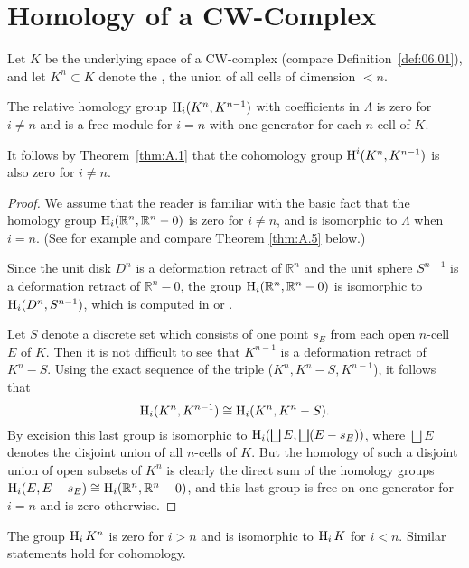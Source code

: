 \documentclass[../main]{subfiles}
\begin{document}
\section{Homology of a CW-Complex}
Let $K$ be the underlying space of a CW-complex (compare Definition~\ref{def:06.01}), and let $K^n \subset K$ denote the , the union of all cells of dimension $<n$. \\
\begin{lemma}\label{lem:A.2}
The relative homology group $\operatorname{H}_i (K^n , K^{n-1})$ with coefficients in $\Lambda$ is zero for $i\neq n$ and is a free module for $i=n$ with one generator for each $n$-cell of $K$.
\end{lemma}
It follows by Theorem~\ref{thm:A.1} that the cohomology group $\operatorname{H}^i (K^n, K^{n-1})$ is also zero for $i\neq n$.

\begin{proof}
We assume that the reader is familiar with the basic fact that the homology group $\operatorname{H}_i (\mathbb{R}^n, \mathbb{R}^n - 0)$ is zero for $i\neq n$, and is isomorphic to $\Lambda$ when $i=n$. (See for example \cite[p. 56]{dold1972} and compare Theorem \ref{thm:A.5} below.) %

Since the unit disk $D^n$ is a deformation retract of $\mathbb{R}^n$ and the unit sphere $S^{n-1}$ is a deformation retract of $\mathbb{R}^n - 0$, the group $\operatorname{H}_i (\mathbb{R}^n, \mathbb{R}^n-0)$ is isomorphic to $\operatorname{H}_i (D^n, S^{n-1})$, which is computed in \cite[p. 45]{eilenbergsteenrod1952} or \cite[p. 45]{spanier1981}.

Let $S$ denote a discrete set which consists of one point $s_E$ from each open $n$-cell $E$ of $K$. Then it is not difficult to see that $K^{n-1}$ is a deformation retract of $K^n - S$. Using the exact sequence of the triple ($K^n, K^n - S, K^{n-1}$), it follows that \[\operatorname{H}_i(K^n, K^{n-1})\cong \operatorname{H}_i (K^n, K^n - S).\] By excision this last group is isomorphic to $\operatorname{H}_i (\bigsqcup E, \bigsqcup (E-s_E))$, where $\bigsqcup E$ denotes the disjoint union of all $n$-cells of $K$. But the homology of such a disjoint union of open subsets of $K^n$ is clearly the direct sum of the homology groups\newline  $\operatorname{H}_i (E, E-s_E)\cong \operatorname{H}_i (\mathbb{R}^n , \mathbb{R}^n - 0)$, and this last group is free on one generator for $i=n$ and is zero otherwise.
\end{proof}

\begin{corollary}\label{cor:A.3}
The group $\operatorname{H}_i K^n$ is zero for $i>n$ and is isomorphic to $\operatorname{H}_i K$ for $i<n$. Similar statements hold for cohomology.
\end{corollary}
\end{document}
